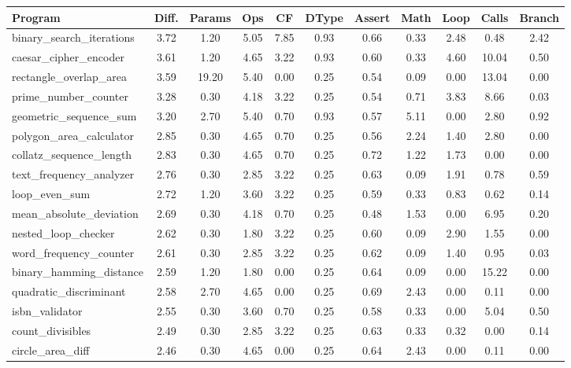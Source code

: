 \documentclass[8pt]{extarticle}
\begin{document}
\begin{table}[H]
\centering
\begin{tabular}{|l|c|c|c|c|c|c|c|c|c|c|}
\hline
\textbf{Program} & \textbf{Diff.} & \textbf{Params} & \textbf{Ops} & \textbf{CF} & \textbf{DType} & \textbf{Assert} & \textbf{Math} & \textbf{Loop} & \textbf{Calls} & \textbf{Branch} \\
\hline
binary\_search\_iterations & 3.72 & 1.20 & 5.05 & 7.85 & 0.93 & 0.66 & 0.33 & 2.48 & 0.48 & 2.42 \\
caesar\_cipher\_encoder & 3.61 & 1.20 & 4.65 & 3.22 & 0.93 & 0.60 & 0.33 & 4.60 & 10.04 & 0.50 \\
rectangle\_overlap\_area & 3.59 & 19.20 & 5.40 & 0.00 & 0.25 & 0.54 & 0.09 & 0.00 & 13.04 & 0.00 \\
prime\_number\_counter & 3.28 & 0.30 & 4.18 & 3.22 & 0.25 & 0.54 & 0.71 & 3.83 & 8.66 & 0.03 \\
geometric\_sequence\_sum & 3.20 & 2.70 & 5.40 & 0.70 & 0.93 & 0.57 & 5.11 & 0.00 & 2.80 & 0.92 \\
polygon\_area\_calculator & 2.85 & 0.30 & 4.65 & 0.70 & 0.25 & 0.56 & 2.24 & 1.40 & 2.80 & 0.00 \\
collatz\_sequence\_length & 2.83 & 0.30 & 4.65 & 0.70 & 0.25 & 0.72 & 1.22 & 1.73 & 0.00 & 0.00 \\
text\_frequency\_analyzer & 2.76 & 0.30 & 2.85 & 3.22 & 0.25 & 0.63 & 0.09 & 1.91 & 0.78 & 0.59 \\
loop\_even\_sum & 2.72 & 1.20 & 3.60 & 3.22 & 0.25 & 0.59 & 0.33 & 0.83 & 0.62 & 0.14 \\
mean\_absolute\_deviation & 2.69 & 0.30 & 4.18 & 0.70 & 0.25 & 0.48 & 1.53 & 0.00 & 6.95 & 0.20 \\
nested\_loop\_checker & 2.62 & 0.30 & 1.80 & 3.22 & 0.25 & 0.60 & 0.09 & 2.90 & 1.55 & 0.00 \\
word\_frequency\_counter & 2.61 & 0.30 & 2.85 & 3.22 & 0.25 & 0.62 & 0.09 & 1.40 & 0.95 & 0.03 \\
binary\_hamming\_distance & 2.59 & 1.20 & 1.80 & 0.00 & 0.25 & 0.64 & 0.09 & 0.00 & 15.22 & 0.00 \\
quadratic\_discriminant & 2.58 & 2.70 & 4.65 & 0.00 & 0.25 & 0.69 & 2.43 & 0.00 & 0.11 & 0.00 \\
isbn\_validator & 2.55 & 0.30 & 3.60 & 0.70 & 0.25 & 0.58 & 0.33 & 0.00 & 5.04 & 0.50 \\
count\_divisibles & 2.49 & 0.30 & 2.85 & 3.22 & 0.25 & 0.63 & 0.33 & 0.32 & 0.00 & 0.14 \\
circle\_area\_diff & 2.46 & 0.30 & 4.65 & 0.00 & 0.25 & 0.64 & 2.43 & 0.00 & 0.11 & 0.00 \\

\end{tabular}
\end{table}
\end{document}
